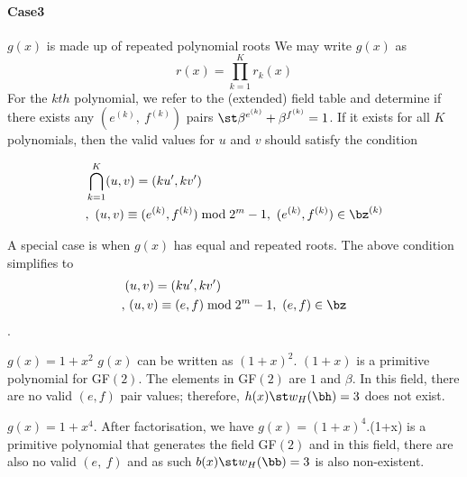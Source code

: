 \paragraph{Case3}$g(x)$ is made up of repeated polynomial roots\newline
We may write $g(x)$ as $$r(x)=\prod_{k=1}^{K}r_k(x)$$ 
For the $kth$ polynomial, we refer to the (extended) field table and determine if there exists any $(e^{(k)},~f^{(k)})$ pairs $\st \beta^{e^{(k)}}+\beta^{f^{(k)}}=1$. If it exists for all $K$ polynomials, then the valid values for $u$ and $v$
 should satisfy the condition

 \begin{equation*}
 \begin{split}
 &\bigcap_{k=1}^{K} (u,v)=(ku',kv')\\
 &,~(u,v) \equiv (e^{(k)},f^{(k)})\bmod 2^{m}-1,~(e^{(k)}, f^{(k)}) \in \bz^{(k)}\\ 
 \end{split}
 \end{equation*}
 
A special case is when $g(x)$ has equal and repeated roots. The above condition simplifies to 
 \begin{equation*}
 \begin{split}
 &(u,v)=(ku',kv')\\,
 &~(u,v) \equiv (e,f)\bmod 2^{m}-1,~(e, f) \in \bz \\
 \end{split}
 \end{equation*}.
 
 \begin{example}
 $g(x)=1+x^2$ \newline $g(x)$ can be written as $(1+x)^2$. $(1+x)$ is a primitive polynomial for GF$(2)$. The elements in GF$(2)$ are $1$ and $\beta$. In this field,  there are no valid $(e,f)$ pair values; therefore, $h(x) \st w_H(\bh)=3$ does not exist.
 \end{example}
 
  \begin{example}
 $g(x) = 1+x^4$.\newline
 After factorisation, we have $g(x)=(1+x)^4. $(1+x) is a primitive polynomial that generates the field GF$(2)$ and in this field, there are also no valid $(e,~f)$ and as such $b(x) \st w_H(\bb)=3$ is also non-existent.
 \end{example}
 
